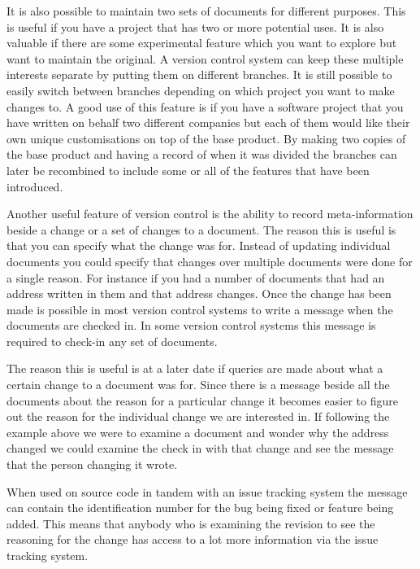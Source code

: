 It is also possible to maintain two sets of documents for different purposes. This is useful if you have a project that has two or more potential uses. It is also valuable if there are some experimental feature which you want to explore but want to maintain the original. A version control system can keep these multiple interests separate by putting them on different branches.  It is still possible to easily switch between branches depending on which project you want to make changes to.  A good use of this feature is if you have a software project that you have written on behalf two different companies but each of them would like their own unique customisations on top of the base product.  By making two copies of the base product and having a record of when it was divided the branches can later be recombined to include some or all of the features that have been introduced. 


Another useful feature of version control is the ability to record meta-information beside a change or a set of changes to a document.  The reason this is useful is that you can specify what the change was for.  Instead of updating individual documents you could specify that changes over multiple documents were done for a single reason.  For instance if you had a number of documents that had an address written in them and that address changes.  Once the change has been made is possible in most version control systems to write a message when the documents are checked in.  In some version control systems this message is required to check-in any set of documents.

The reason this is useful is at a later date if queries are made about what a certain change to a document was for.  Since there is a message beside all the documents about the reason for a particular change it becomes easier to figure out the reason for the individual change we are interested in. If following the example above we were to examine a document and wonder why the address changed we could examine the check in with that change and see the message that the person changing it wrote.

When used on source code in tandem with an issue tracking system the message can contain the identification number for the bug being fixed or feature being added.  This means that anybody who is examining the revision to see the reasoning for the change has access to a lot more information via the issue tracking system.

